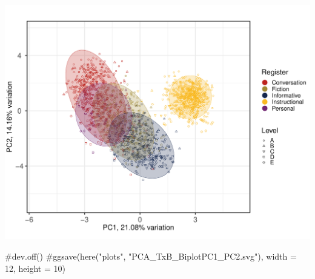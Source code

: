 \documentclass[
  letterpaper,
  DIV=11,
  numbers=noendperiod]{scrreprt}
\newenvironment{Shaded}{\begin{snugshade}}{\end{snugshade}}
\newcommand{\CommentTok}[1]{\textcolor[rgb]{0.37,0.37,0.37}{#1}}
\begin{document}
\includegraphics{AppendixF_files/figure-pdf/PCAtools-biplots-TxB-1.pdf}

\begin{Shaded}
\begin{Highlighting}[]
\CommentTok{\#dev.off()}
\CommentTok{\#ggsave(here("plots", "PCA\_TxB\_BiplotPC1\_PC2.svg"), width = 12, height = 10)}
\end{Highlighting}
\end{Shaded}
\end{document}
